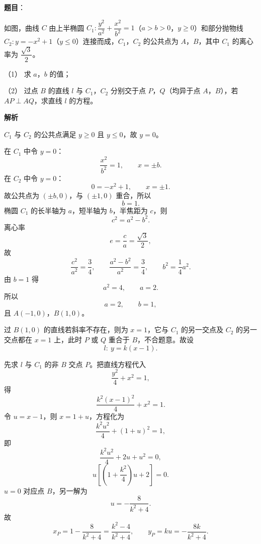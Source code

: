 \begin{answer}

\textbf{题目}：

如图，曲线 $C$ 由上半椭圆 $C_1:\dfrac{y^2}{a^2}+\dfrac{x^2}{b^2}=1$（$a>b>0$，$y\geqslant 0$）和部分抛物线 $C_2:y=-x^2+1$（$y\leqslant 0$）连接而成，$C_1$，$C_2$ 的公共点为 $A$，$B$，其中 $C_1$ 的离心率为 $\dfrac{\sqrt3}{2}$。
\nopagebreak[4]
\begin{center}\end{center}
\nopagebreak[4]
（1） 求 $a$，$b$ 的值；

（2） 过点 $B$ 的直线 $l$ 与 $C_1$，$C_2$ 分别交于点 $P$，$Q$（均异于点 $A$，$B$），若 $AP\perp AQ$，求直线 $l$ 的方程。

\textbf{解析}


$C_1$ 与 $C_2$ 的公共点满足 $y\geqslant0$ 且 $y\leqslant0$，故 $y=0$。

在 $C_1$ 中令 $y=0$：
\nopagebreak[4]
\[\frac{x^2}{b^2}=1,\qquad x=\pm b.\]
在 $C_2$ 中令 $y=0$：
\nopagebreak[4]
\[0=-x^2+1,\qquad x=\pm1.\]
故公共点为 $(\pm b,0)$，与 $(\pm1,0)$ 重合，所以
\nopagebreak[4]
\[b=1.\]
椭圆 $C_1$ 的长半轴为 $a$，短半轴为 $b$，半焦距为 $c$，则
\nopagebreak[4]
\[c^2=a^2-b^2.\]
离心率
\nopagebreak[4]
\[e=\frac ca=\frac{\sqrt3}{2},\]
故
\nopagebreak[4]
\[\frac{c^2}{a^2}=\frac34,\qquad \frac{a^2-b^2}{a^2}=\frac34,\qquad b^2=\frac14a^2.\]
由 $b=1$ 得
\nopagebreak[4]
\[a^2=4,\qquad a=2.\]
所以
\nopagebreak[4]
\[a=2,\qquad b=1,\]
且 $A(-1,0)$，$B(1,0)$。


过 $B(1,0)$ 的直线若斜率不存在，则为 $x=1$，它与 $C_1$ 的另一交点及 $C_2$ 的另一交点都在 $x=1$ 上，此时 $P$ 或 $Q$ 重合于 $B$，不合题意。故设
\nopagebreak[4]
\[l:\ y=k(x-1).\]

先求 $l$ 与 $C_1$ 的非 $B$ 交点 $P$。把直线方程代入
\nopagebreak[4]
\[\frac{y^2}{4}+x^2=1,\]
得
\nopagebreak[4]
\[\frac{k^2(x-1)^2}{4}+x^2=1.\]
令 $u=x-1$，则 $x=1+u$，方程化为
\nopagebreak[4]
\[\frac{k^2u^2}{4}+(1+u)^2=1,\]
即
\nopagebreak[4]
\[\frac{k^2u^2}{4}+2u+u^2=0,\]
\nopagebreak[4]
\[u\left[\left(1+\frac{k^2}{4}\right)u+2\right]=0.\]
$u=0$ 对应点 $B$，另一解为
\nopagebreak[4]
\[u=-\frac{8}{k^2+4}.\]
故
\nopagebreak[4]
\[x_P=1-\frac{8}{k^2+4}=\frac{k^2-4}{k^2+4},\qquad
y_P=k u=-\frac{8k}{k^2+4}.\]


\end{answer}
